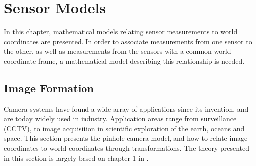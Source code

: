 \graphicspath{{fig/}}
\chapter{Sensor Models}
In this chapter, mathematical models relating sensor measurements to world coordinates are presented. In order to associate measurements from one sensor to the other, as well as measurements from the sensors with a common world coordinate frame, a mathematical model describing this relationship is needed.
\section{Image Formation}
Camera systems have found a wide array of applications since its invention, and are today widely used in industry. Application areas range from surveillance (CCTV), to image acquisition in scientific exploration of the earth, oceans and space.  This section presents the pinhole camera model, and how to relate image coordinates to world coordinates through transformations. The theory presented in this section is largely based on chapter 1 in \cite{modernCV}.
